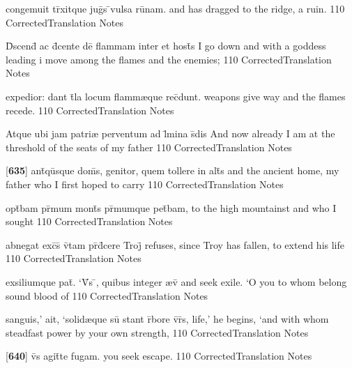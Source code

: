 \latline
  {congemuit tr\={}xitque jug\={\macron {\i}}s \={}vulsa ru\={\macron {\i}}nam.}
  { and has dragged to the ridge, a ruin.  }
  {110}
  { CorrectedTranslation }
  { Notes }


\latline
  {D\={}scend\={} ac d\={}cente de\={} flammam inter et host\={\macron {\i}}s}
  { I go down and with a goddess leading i move among the flames and the enemies; }
  {110}
  { CorrectedTranslation }
  { Notes }


\latline
  {expedior: dant t\={}la locum flamm{\ae}que rec\={}dunt.}
  { weapons give way and the flames recede. }
  {110}
  { CorrectedTranslation }
  { Notes }


\latline
  {Atque ubi jam patri{\ae} perventum ad l\={\macron {\i}}mina s\={}dis}
  { And now already I am at the threshold of the seats of my father }
  {110}
  { CorrectedTranslation }
  { Notes }


\latline
  {[\textbf{635}] ant\={\macron {\i}}qu\={}sque dom\={}s, genitor, quem tollere in alt\={}s}
  { and the ancient home, my father who I first hoped to carry  }
  {110}
  { CorrectedTranslation }
  { Notes }


\latline
  {opt\={}bam pr\={\macron {\i}}mum mont\={\macron {\i}}s pr\={\macron {\i}}mumque pet\={}bam,}
  { to the high mountainst and who I sought  }
  {110}
  { CorrectedTranslation }
  { Notes }


\latline
  {abnegat exc\={\macron {\i}}s\={} v\={\macron {\i}}tam pr\={}d\={}cere Troj\={}}
  { refuses, since Troy has fallen, to extend his life }
  {110}
  { CorrectedTranslation }
  { Notes }


\latline
  {exsiliumque pat\={\macron {\i}}.  `V\={}s \={}, quibus integer {\ae}v\={\macron {\i}}}
  { and seek exile. `O you to whom belong sound blood of  }
  {110}
  { CorrectedTranslation }
  { Notes }


\latline
  {sanguis,' ait, `solid{\ae}que su\={} stant r\={}bore v\={\macron {\i}}r\={}s,}
  { life,' he begins, `and with whom steadfast power by your own strength,  }
  {110}
  { CorrectedTranslation }
  { Notes }


\latline
  {[\textbf{640}] v\={}s agit\={}te fugam.}
  { you seek escape. }
  {110}
  { CorrectedTranslation }
  { Notes }


